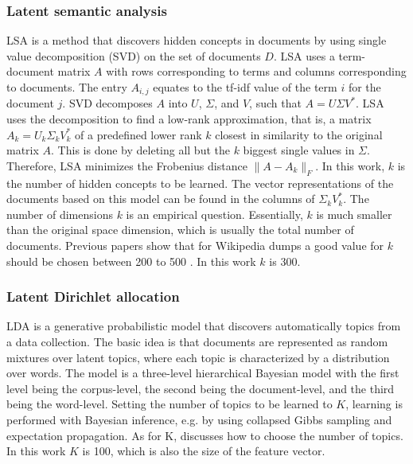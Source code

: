 \documentclass[a4paper]{article}
\begin{document}
\subsubsection{Latent semantic analysis}
LSA \cite{deerwester1990indexing} is a method that discovers hidden concepts in documents by using single value decomposition (SVD) on the set of documents $D$.
LSA uses a term-document matrix $A$ with rows corresponding to terms and columns corresponding to documents. The entry $A_{i,j}$ equates to the tf-idf value of the term $i$ for the document $j$. SVD decomposes $A$ into $U$, $\Sigma$, and $V$, such that $A = U \Sigma V^*$.
LSA uses the decomposition to find a low-rank approximation, that is, a matrix $A_k = U_k \Sigma_k V_k^*$ of a predefined lower rank $k$ closest in similarity to the original matrix $A$. This is done by deleting all but the $k$ biggest single values in $\Sigma$.
Therefore, LSA minimizes the Frobenius distance $\|A-A_k\|_F$. In this work, $k$ is the number of hidden concepts to be learned. The vector representations of the documents based on this model can be found in the columns of $\Sigma_k V_k^*$.
The number of dimensions $k$ is an empirical question. Essentially, $k$ is much smaller than the original space dimension, which is usually the total number of documents. Previous papers show that for Wikipedia dumps a good value for $k$ should be chosen between 200 to 500 \cite{bradford2008empirical}. In this work $k$ is 300.


\subsubsection{Latent Dirichlet allocation}
LDA \cite{blei2003latent} is a generative probabilistic model that discovers automatically topics from a data collection.
The basic idea is that documents are represented as random mixtures over latent topics, where each topic is characterized by a distribution over words. The model is a three-level hierarchical Bayesian model with the first level being the corpus-level, the second being the document-level, and the third being the word-level. Setting the number of topics to be learned to $K$, learning is performed with Bayesian inference, e.g. by using collapsed Gibbs sampling and expectation propagation. As for K, \cite{hoffman2010online} discusses how to choose the number of topics. In this work $K$ is 100, which is also the size of the feature vector.
\end{document}
